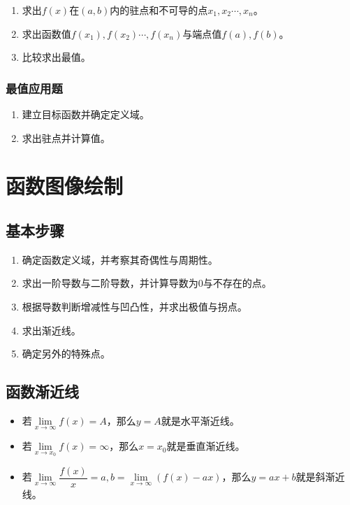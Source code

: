\documentclass[UTF8, 12pt]{ctexart}
\begin{document}
\begin{enumerate}
    \item 求出$f(x)$在$(a,b)$内的驻点和不可导的点$x_1,x_2\cdots,x_n$。
    \item 求出函数值$f(x_1),f(x_2)\cdots,f(x_n)$与端点值$f(a),f(b)$。
    \item 比较求出最值。
\end{enumerate}

\subsubsection{最值应用题}

\begin{enumerate}
    \item 建立目标函数并确定定义域。
    \item 求出驻点并计算值。
\end{enumerate}

\section{函数图像绘制}

\subsection{基本步骤}

\begin{enumerate}
    \item 确定函数定义域，并考察其奇偶性与周期性。
    \item 求出一阶导数与二阶导数，并计算导数为0与不存在的点。
    \item 根据导数判断增减性与凹凸性，并求出极值与拐点。
    \item 求出渐近线。
    \item 确定另外的特殊点。
\end{enumerate}

\subsection{函数渐近线}

\begin{itemize}
    \item 若$\lim\limits_{x\to\infty}f(x)=A$，那么$y=A$就是水平渐近线。
    \item 若$\lim\limits_{x\to x_0}f(x)=\infty$，那么$x=x_0$就是垂直渐近线。
    \item 若$\lim\limits_{x\to\infty}\dfrac{f(x)}{x}=a,b=\lim\limits_{x\to\infty}(f(x)-ax)$，那么$y=ax+b$就是斜渐近线。
\end{itemize}
\end{document}
